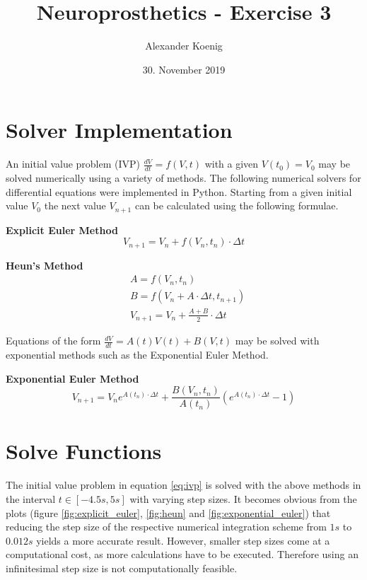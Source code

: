 \documentclass{scrartcl}
\title{Neuroprosthetics - Exercise 3}
\author{Alexander Koenig}
\date{30. November 2019}
\begin{document}
\maketitle

\section{Solver Implementation}

An initial value problem (IVP) $\frac{dV}{dt} = f(V,t)$ with a given $V(t_0) = V_0$ may be solved numerically using a variety of methods. The following numerical solvers for differential equations were implemented in Python. Starting from a given initial value $V_0$ the next value $V_{n+1}$ can be calculated using the following formulae.

\textbf{Explicit Euler Method}
\begin{equation}
	\label{eq:explicit_euler}
	V_{n+1} = V_n + f(V_n, t_n)\cdot \Delta t
\end{equation}

\textbf{Heun's Method}
\begin{align}	
	\label{eq:heun}
	&A = f(V_n, t_n) \\
	&B = f(V_n + A \cdot \Delta t, t_{n+1}) \\
	&V_{n+1} = V_n + \frac{A + B}{2} \cdot \Delta t
\end{align}

Equations of the form $\frac{dV}{dt} = A(t)V(t) + B(V,t)$ may be solved with exponential methods such as the Exponential Euler Method.

\textbf{Exponential Euler Method}
\begin{equation}
	\label{eq:exponential_euler}
	V_{n+1} = V_n e^{A(t_n) \cdot \Delta t} + \frac{B(V_n,t_n)}{A(t_n)}(e^{A(t_n) \cdot \Delta t} - 1)
\end{equation}

\newpage
\section{Solve Functions}

The initial value problem in equation \ref{eq:ivp} is solved with the above methods in the interval $t \in [-4.5s, 5s]$ with varying step sizes. It becomes obvious from the plots (figure \ref{fig:explicit_euler}, \ref{fig:heun} and \ref{fig:exponential_euler}) that reducing the step size of the respective numerical integration scheme from $1s$ to $0.012s$ yields a more accurate result. However, smaller step sizes come at a computational cost, as more calculations have to be executed. Therefore using an infinitesimal step size is not computationally feasible.
\end{document}

